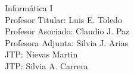 \thispagestyle{empty}

\Large{Informática I}\\

\noindent Profesor Titular: Luis E. Toledo\\
Profesor Asociado: Claudio J. Paz\\
Profesora Adjunta: Silvia J. Arias\\

\medskip
\noindent JTP: Nievas Martin\\
JTP: Silvia A. Carrera

